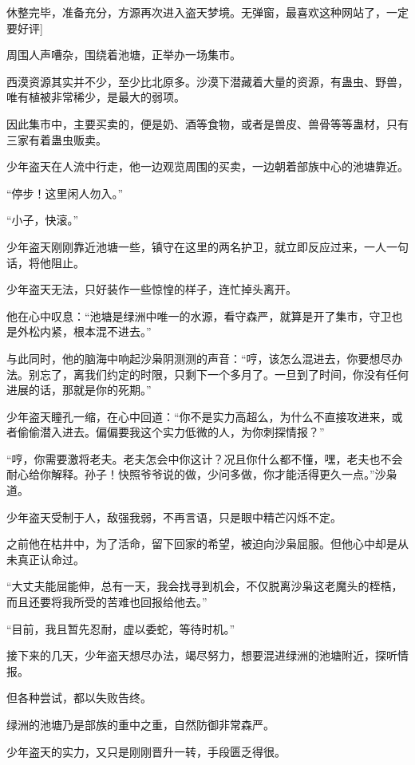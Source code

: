 
\begin{this_body}

休整完毕，准备充分，方源再次进入盗天梦境。无弹窗，最喜欢这种网站了，一定要好评]

周围人声嘈杂，围绕着池塘，正举办一场集市。

西漠资源其实并不少，至少比北原多。沙漠下潜藏着大量的资源，有蛊虫、野兽，唯有植被非常稀少，是最大的弱项。

因此集市中，主要买卖的，便是奶、酒等食物，或者是兽皮、兽骨等等蛊材，只有三家有着蛊虫贩卖。

少年盗天在人流中行走，他一边观览周围的买卖，一边朝着部族中心的池塘靠近。

“停步！这里闲人勿入。”

“小子，快滚。”

少年盗天刚刚靠近池塘一些，镇守在这里的两名护卫，就立即反应过来，一人一句话，将他阻止。

少年盗天无法，只好装作一些惊惶的样子，连忙掉头离开。

他在心中叹息：“池塘是绿洲中唯一的水源，看守森严，就算是开了集市，守卫也是外松内紧，根本混不进去。”

与此同时，他的脑海中响起沙枭阴测测的声音：“哼，该怎么混进去，你要想尽办法。别忘了，离我们约定的时限，只剩下一个多月了。一旦到了时间，你没有任何进展的话，那就是你的死期。”

少年盗天瞳孔一缩，在心中回道：“你不是实力高超么，为什么不直接攻进来，或者偷偷潜入进去。偏偏要我这个实力低微的人，为你刺探情报？”

“哼，你需要激将老夫。老夫怎会中你这计？况且你什么都不懂，嘿，老夫也不会耐心给你解释。孙子！快照爷爷说的做，少问多做，你才能活得更久一点。”沙枭道。

少年盗天受制于人，敌强我弱，不再言语，只是眼中精芒闪烁不定。

之前他在枯井中，为了活命，留下回家的希望，被迫向沙枭屈服。但他心中却是从未真正认命过。

“大丈夫能屈能伸，总有一天，我会找寻到机会，不仅脱离沙枭这老魔头的桎梏，而且还要将我所受的苦难也回报给他去。”

“目前，我且暂先忍耐，虚以委蛇，等待时机。”

接下来的几天，少年盗天想尽办法，竭尽努力，想要混进绿洲的池塘附近，探听情报。

但各种尝试，都以失败告终。

绿洲的池塘乃是部族的重中之重，自然防御非常森严。

少年盗天的实力，又只是刚刚晋升一转，手段匮乏得很。


\end{this_body}
